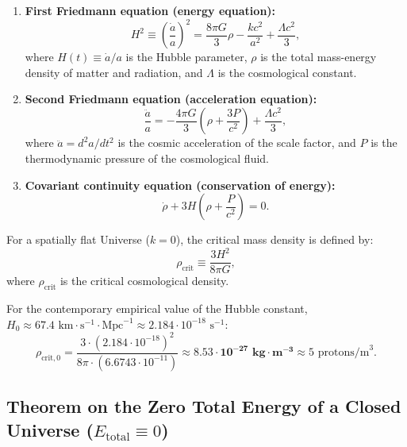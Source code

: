\documentclass[11pt,a4paper]{article}
\theoremstyle{definition}
\begin{document}
\begin{enumerate}
\item \textbf{First Friedmann equation (energy equation):}
\begin{equation}\label{eq:3.2}\tag{3.2}
H^2 \equiv \left( \frac{\dot{a}}{a} \right)^2 = \frac{8\pi G}{3} \rho - \frac{k c^2}{a^2} + \frac{\Lambda c^2}{3},
\end{equation}
where $H(t) \equiv \dot{a}/a$ is the Hubble parameter, $\rho$ is the total mass-energy density of matter and radiation, and $\Lambda$ is the cosmological constant.

\item \textbf{Second Friedmann equation (acceleration equation):}
\begin{equation}\label{eq:3.3}\tag{3.3}
\frac{\ddot{a}}{a} = -\frac{4\pi G}{3} \left( \rho + \frac{3P}{c^2} \right) + \frac{\Lambda c^2}{3},
\end{equation}
where $\ddot{a} = d^2 a / dt^2$ is the cosmic acceleration of the scale factor, and $P$ is the thermodynamic pressure of the cosmological fluid.

\item \textbf{Covariant continuity equation (conservation of energy):}
\begin{equation}\label{eq:3.4}\tag{3.4}
\dot{\rho} + 3 H \left( \rho + \frac{P}{c^2} \right) = 0.
\end{equation}
\end{enumerate}

For a spatially flat Universe ($k = 0$), the critical mass density is defined by:
\begin{equation}\label{eq:3.5}\tag{3.5}
\rho_{\text{crit}} \equiv \frac{3 H^2}{8\pi G},
\end{equation}
where $\rho_{\text{crit}}$ is the critical cosmological density.

For the contemporary empirical value of the Hubble constant, $H_0 \approx 67.4\text{ km}\cdot\text{s}^{-1}\cdot\text{Mpc}^{-1} \approx 2.184 \cdot 10^{-18}\text{ s}^{-1}$:
\begin{equation}\label{eq:3.6}\tag{3.6}
\rho_{\text{crit}, 0} = \frac{3 \cdot (2.184 \cdot 10^{-18})^2}{8\pi \cdot (6.6743 \cdot 10^{-11})} \approx \mathbf{8.53 \cdot 10^{-27}\text{ kg}\cdot\text{m}^{-3}} \approx 5\text{ protons/m}^3.
\end{equation}

\subsection{Theorem on the Zero Total Energy of a Closed Universe ($E_{\text{total}} \equiv 0$)}\label{sec:3.2}
\end{document}
